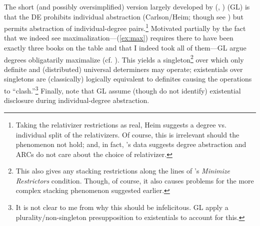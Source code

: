 \documentclass[11pt]{article}
\begin{document}
\begin{exe}
	\label{ex:arc}
	\label{ex:a-trc}
\end{exe}

The short (and possibly oversimplified) version largely developed by \citeauthor{grosuStrangeRelativesThird1998} (\citeyear{grosuStrangeRelativesThird1998}, \citeyear{grosuAmountRelatives2017}) (GL) is that the DE prohibits individual abstraction (Carlson/Heim; though see \cite{postalContrastingExtractionTypes1994}) but permits abstraction of individual-degree pairs.\footnote{Taking the relativizer restrictions as real, Heim suggests a degree vs. individual split of the relativizers. Of course, this is irrelevant should the phenomenon not hold; and, in fact, \citet{kayThatVsWhich}'s data suggests degree abstraction and ARCs do not care about the choice of relativizer.} Motivated partially by the fact that we indeed see maximalization---(\ref{ex:max}) requires there to have been exactly three books on the table and that I indeed took all of them---GL argue degrees obligatarily maximalize (cf. \cite{rullmannMaximalitySemanticsOfwhconstructions1995}). This yields a singleton\footnote{This also gives any stacking restrictions along the lines of \citet{schlenkerMinimizeRestrictorsNotes2005}'s \textit{Minimize Restrictors} condition. Though, of course, it also causes problems for the more complex stacking phenomenon suggested earlier.} over which only definite and (distributed) universal determiners may operate; existentials over singletons are (classically) logically equivalent to definites causing the operations to ``clash.''\footnote{It is not clear to me from \citet{grosuStrangeRelativesThird1998} why this should be infelicitous. GL apply a plurality/non-singleton presupposition to existentials to account for this.} Finally, note that GL assume (though do not identify) existential disclosure during individual-degree abstraction.

\begin{exe}
	\label{ex:max}
\end{exe}
\end{document}
